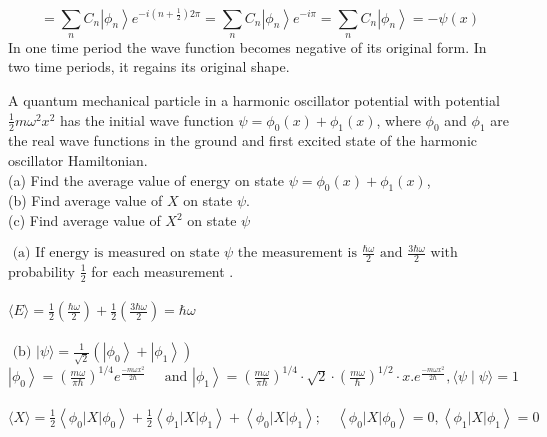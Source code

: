 \begin{enumerate}
\begin{answer}
$$	$$
	$$=\sum_{n} C_{n}\left|\phi_{n}\right\rangle e^{-i\left(n+\frac{1}{2}\right) 2 \pi}=\sum_{n} C_{n}\left|\phi_{n}\right\rangle e^{-i \pi}=\sum_{n} C_{n}\left|\phi_{n}\right\rangle=-\psi(x)$$
	In one time period the wave function becomes negative of its original form. In two time periods, it regains its original shape.
\end{answer}
	\begin{minipage}{\textwidth}
	\item A quantum mechanical particle in a harmonic oscillator potential with potential $\frac{1}{2} m \omega^{2} x^{2}$ has the initial wave function $\psi=\phi_{0}(x)+\phi_{1}(x)$, where $\phi_{0}$ and $\phi_{1}$ are the real wave functions in the ground and first excited state of the harmonic oscillator Hamiltonian.\\
	(a) Find the average value of energy on state $\psi=\phi_{0}(x)+\phi_{1}(x)$,\\
	(b) Find average value of $X$ on state $\psi$.\\
	(c) Find average value of $X^{2}$ on state $\psi$
\end{minipage}
\begin{answer}
$\text { (a) If energy is measured on state } \psi \text { the measurement is } \frac{\hbar \omega}{2} \text { and } \frac{3 \hbar \omega}{2} \text { with }$\\
probability $\frac{1}{2}$ for each measurement .\\\\
$\langle E\rangle=\frac{1}{2}\left(\frac{\hbar \omega}{2}\right)+\frac{1}{2}\left(\frac{3 \hbar \omega}{2}\right)=\hbar \omega$\\\\
$\text { (b) }|\psi\rangle=\frac{1}{\sqrt{2}}\left(\left|\phi_{0}\right\rangle+\left|\phi_{1}\right\rangle\right)$\\
$\left|\phi_{0}\right\rangle=\left(\frac{m \omega}{\pi \hbar}\right)^{1 / 4} e^{\frac{-m \omega x^{2}}{2 \hbar}} \quad \text { and }\left|\phi_{1}\right\rangle=\left(\frac{m \omega}{\pi \hbar}\right)^{1 / 4} \cdot \sqrt{2} \cdot\left(\frac{m \omega}{\hbar}\right)^{1 / 2} \cdot x . e^{\frac{-m \omega x^{2}}{2 \hbar}},\langle\psi \mid \psi\rangle=1$\\\\
$\langle X\rangle=\frac{1}{2}\left\langle\phi_{0}|X| \phi_{0}\right\rangle+\frac{1}{2}\left\langle\phi_{1}|X| \phi_{1}\right\rangle+\left\langle\phi_{0}|X| \phi_{1}\right\rangle ; \quad\left\langle\phi_{0}|X| \phi_{0}\right\rangle=0,\left\langle\phi_{1}|X| \phi_{1}\right\rangle=0$\\\\

\end{answer}
\end{enumerate}
